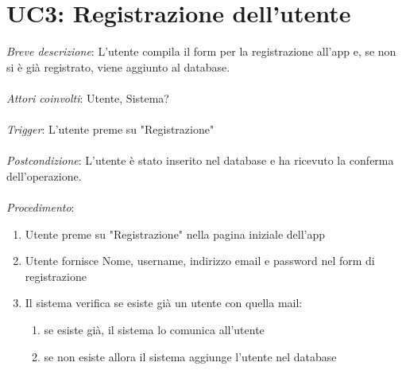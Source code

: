 \section{UC3: Registrazione dell'utente}
\emph{Breve descrizione}: L'utente compila il form per la registrazione all'app e, se non si è già registrato, viene aggiunto al database.\\\\
\emph{Attori coinvolti}: Utente, Sistema?\\\\
\emph{Trigger}: L'utente preme su "Registrazione"\\\\
\emph{Postcondizione}: L'utente è stato inserito nel database e ha ricevuto la conferma dell'operazione.\\\\
\emph{Procedimento}:
\begin{enumerate}
    \item Utente preme su "Registrazione" nella pagina iniziale dell'app
    \item Utente fornisce Nome, username, indirizzo email e password nel form di registrazione
    \item Il sistema verifica se esiste già un utente con quella mail:
          \begin{enumerate}
              \item se esiste già, il sistema lo comunica all'utente
              \item se non esiste allora il sistema aggiunge l'utente nel database
          \end{enumerate}
\end{enumerate}

